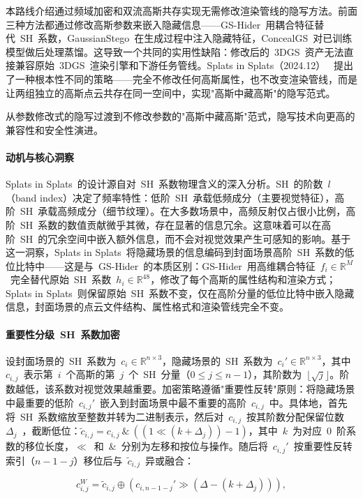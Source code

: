 本路线介绍通过频域加密和双流高斯共存实现无需修改渲染管线的隐写方法。前面三种方法都通过修改高斯参数来嵌入隐藏信息——GS-Hider~用耦合特征替代~SH~系数，GaussianStego~在生成过程中注入隐藏特征，ConcealGS~对已训练模型做后处理蒸馏。这导致一个共同的实用性缺陷：修改后的~3DGS~资产无法直接兼容原始~3DGS~渲染引擎和下游任务管线。Splats in Splats（2024.12）~\cite{2412_03121} 提出了一种根本性不同的策略——完全不修改任何高斯属性，也不改变渲染管线，而是让两组独立的高斯点云共存在同一空间中，实现"高斯中藏高斯"的隐写范式。

从参数修改式的隐写过渡到不修改参数的"高斯中藏高斯"范式，隐写技术向更高的兼容性和安全性演进。

\paragraph{动机与核心洞察}Splats in Splats~的设计源自对~SH~系数物理含义的深入分析。SH~的阶数~$l$（band index）决定了频率特性：低阶~SH~承载低频成分（主要视觉特征），高阶~SH~承载高频成分（细节纹理）。在大多数场景中，高频反射仅占很小比例，高阶~SH~系数的数值贡献微乎其微，存在显著的信息冗余。这意味着可以在高阶~SH~的冗余空间中嵌入额外信息，而不会对视觉效果产生可感知的影响。基于这一洞察，Splats in Splats~将隐藏场景的信息编码到封面场景高阶~SH~系数的低位比特中——这是与~GS-Hider~的本质区别：GS-Hider~用高维耦合特征~$f_i \in \mathbb{R}^M$~完全替代原始~SH~系数~$h_i \in \mathbb{R}^{48}$，修改了每个高斯的属性结构和渲染方式；Splats in Splats~则保留原始~SH~系数不变，仅在高阶分量的低位比特中嵌入隐藏信息，封面场景的点云文件结构、属性格式和渲染管线完全不变。

\paragraph{重要性分级~SH~系数加密}设封面场景的~SH~系数为~$c_i \in \mathbb{R}^{n \times 3}$，隐藏场景的~SH~系数为~$c_i' \in \mathbb{R}^{n \times 3}$，其中~$c_{i,j}$~表示第~$i$~个高斯的第~$j$~个~SH~分量（$0 \leq j \leq n-1$），其阶数为~$\lfloor \sqrt{j} \rfloor$。阶数越低，该系数对视觉效果越重要。加密策略遵循"重要性反转"原则：将隐藏场景中最重要的低阶~$c_{i,j}'$~嵌入到封面场景中最不重要的高阶~$c_{i,j}$~中。具体地，首先将~SH~系数缩放至整数并转为二进制表示，然后对~$c_{i,j}$~按其阶数分配保留位数~$\Delta_j$~，截断低位：$\tilde{c}_{i,j} = c_{i,j}~\&~((1 \ll (k + \Delta_j)) - 1)$，其中~$k$~为对应~0~阶系数的移位长度，$\ll$~和~$\&$~分别为左移和按位与操作。随后将~$c_{i,j}'$~按重要性反转索引（$n-1-j$）移位后与~$\tilde{c}_{i,j}$~异或融合：

\begin{equation}
    c_{i,j}^W = \tilde{c}_{i,j} \oplus (c_{i,n-1-j}' \gg (\Delta - (k + \Delta_j))),
\end{equation}

